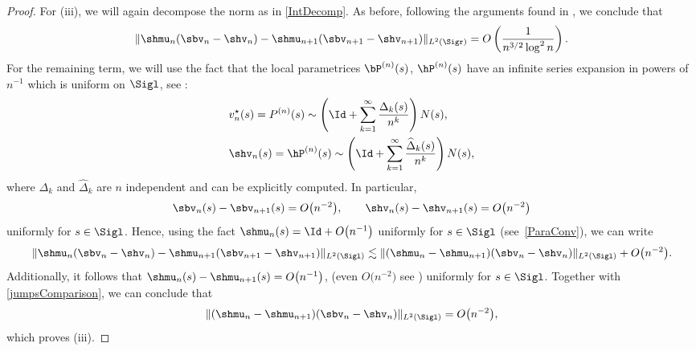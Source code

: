 \begin{proof}
For (iii), we will again decompose the norm as in \eqref{IntDecomp}. As before, following the arguments found in \cite[Proposition~B.2]{CD}, we conclude that
\begin{align*}
\Vert \shmu_n (\sbv_n - \shv_n) - \shmu_{n+1} (\sbv_{n+1} - \shv_{n+1}) \Vert_{L^2(\Sigr)} = O\left(\frac{1}{n^{3/2}\log^2 n}\right).
\end{align*}
For the remaining term, we will use the fact that the local parametrices $\bP^{(n)}(s)$, $\hP^{(n)}(s)$ have an infinite series expansion in powers of $n^{-1}$ which is uniform on $\Sigl$, see \cite[equation~(8.2)]{KMVV}:
\begin{align*}
& v_n^\star(s)= P^{(n)}(s) \sim \left( \Id + \sum_{k=1}^\infty \frac{\Delta_k(s)}{n^k}\right) N(s),
 \\
& \shv_n(s)= \hP^{(n)}(s) \sim \left( \Id + \sum_{k=1}^\infty \frac{\widehat \Delta_k(s)}{n^k}\right) N(s),
\end{align*}
where $\Delta_k$ and $\widehat \Delta_k$ are $n$ independent and can be explicitly computed. In particular, \begin{align}\label{vinftyEst}
 \sbv_n(s) - \sbv_{n+1}(s) = O\big(n^{-2}\big), \qquad \shv_n(s) - \shv_{n+1}(s) = O\big(n^{-2}\big)
\end{align}
uniformly for $s \in \Sigl$. Hence, using the fact $\shmu_n(s) = \Id + O\big(n^{-1}\big)$ uniformly for $s \in \Sigl$ (see~\eqref{ParaConv}), we can write
\begin{align*}
 \Vert \shmu_n (\sbv_n - \shv_n) - \shmu_{n+1} (\sbv_{n+1} - \shv_{n+1}) \Vert_{L^2(\Sigl)}
 \lesssim \Vert (\shmu_n-\shmu_{n+1}) (\sbv_n-\shv_n) \Vert_{L^2(\Sigl)} + O\big(n^{-2}\big).
\end{align*}
Additionally, it follows that $\shmu_n(s)-\shmu_{n+1}(s) = O\big(n^{-1}\big)$, (even $O\big(n^{-2}\big)$ see \cite[equation~(8.7)]{KMVV}) uniformly for $s \in \Sigl$. Together with \eqref{jumpsComparison}, we can conclude that
\begin{align*}
 \Vert (\shmu_n-\shmu_{n+1}) (\sbv_n-\shv_n) \Vert_{L^2(\Sigl)} = O\big(n^{-2}\big),
\end{align*}
which proves (iii).


\end{proof}
